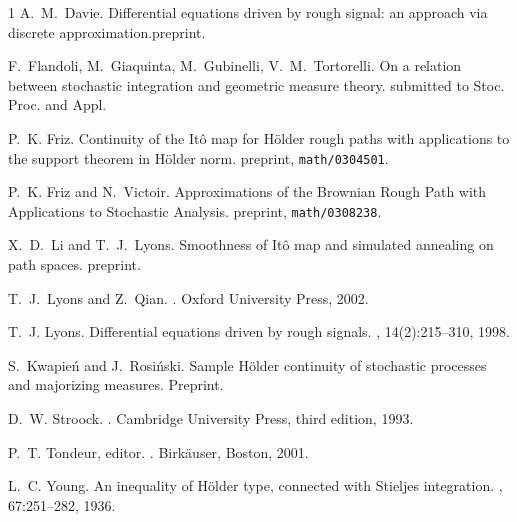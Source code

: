 \documentclass[a4paper,12pt,reqno]{amsproc}
\begin{document}
\begin{thebibliography}{1}
 A.~M.~Davie.
\newblock Differential equations driven by rough signal: an approach
via discrete approximation.\newblock preprint.

 F.~Flandoli, M.~Giaquinta, M.~Gubinelli,
V.~M.~Tortorelli.
\newblock On a relation between stochastic integration and geometric
measure theory. \newblock submitted to Stoc. Proc. and Appl.

P.~K. Friz.
\newblock Continuity of the {I}t\^o map for {H}\"older rough paths with
  applications to the support theorem in {H}\"older norm.
\newblock preprint, {\tt math/0304501}.


P.~K. Friz and N.~Victoir.
\newblock Approximations of the Brownian Rough Path with Applications
to Stochastic Analysis.
\newblock preprint, {\tt math/0308238}.

 X.~D.~Li and T.~J.~Lyons.
\newblock Smoothness of {I}t\^o map and simulated annealing on path
spaces.
\newblock preprint.

T.~J.~Lyons and Z.~Qian.
.
\newblock Oxford University Press, 2002.

T.~J. Lyons.
\newblock Differential equations driven by rough signals.
, 14(2):215--310, 1998.


S.~Kwapie\'n and J.~Rosi\'nski.
\newblock Sample H\"older continuity of stochastic processes and
majorizing measures.
\newblock Preprint.

D.~W. Stroock.
.
\newblock Cambridge University Press, third edition, 1993.

P.~T. Tondeur, editor.
.
\newblock Birk\"auser, Boston, 2001.

L.~C. Young.
\newblock An inequality of H\"older type, connected with Stieljes integration.
, 67:251--282, 1936.

\end{thebibliography}
\end{document}
